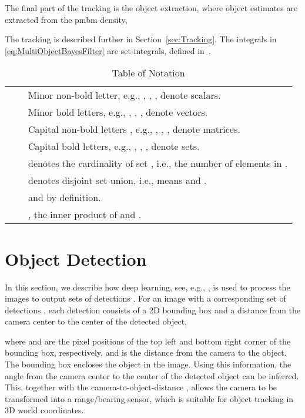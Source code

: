 \documentclass[conference]{IEEEtran}
\newcommand{\tabitem}{\textbullet~~&}
\begin{document}
The final part of the tracking is the object extraction, where object estimates are extracted from the \gls{pmbm} density,

The tracking is described further in Section~\ref{sec:Tracking}. The integrals in \eqref{eq:MultiObjectBayesFilter} are set-integrals, defined in~\cite{Mahler2007}.



 
\begin{table}[t]\caption{Table of Notation}
  \begin{center}
    \begin{tabularx}{\columnwidth}{r@{}X}
      \toprule

      \tabitem Minor non-bold letter, e.g., , , , denote
      scalars. \\
      \tabitem Minor bold letters, e.g.,  , , , denote vectors. \\
      \tabitem Capital non-bold letters , e.g., , ,
      , denote matrices. \\
      \tabitem Capital bold letters, e.g., , , , denote sets. \\
      \tabitem  denotes the cardinality of set ,
      i.e., the number of elements in . \\
      \tabitem  denotes disjoint set union, i.e.,
       means  and
      . \\
      \tabitem 
      and  by definition.\\
      \tabitem , the inner product of  and . \\

      \bottomrule
    \end{tabularx}
  \end{center}
\end{table}
 
\section{Object Detection}
\label{sec:Detections}

In this section, we describe how deep learning, see, e.g., \cite{Lecun2015}, is used to process the images  to output sets of detections . For an image  with a corresponding set of detections , each detection  consists of a 2D bounding box and a distance from the camera center to the center of the detected object,

where  and  are the pixel positions of the top left and bottom right corner of the bounding box,
respectively, and  is the distance from the camera to the object. The bounding box encloses the object in the image. Using this information, the angle from the camera center to the center of the detected object can be inferred. This, together with the camera-to-object-distance , allows the camera to be transformed into a range/bearing sensor, which is suitable for object tracking in 3D world coordinates.
\end{document}
